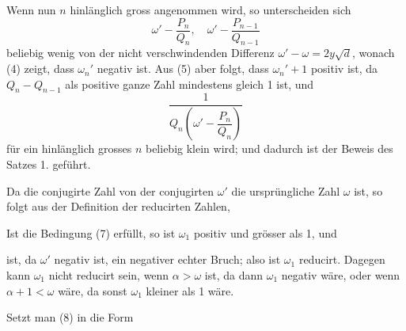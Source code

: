 

Wenn nun $n$ hinlänglich gross angenommen wird, so unterscheiden sich
\[
\omega' - \frac{P_n}{Q_n}, \quad \omega' - \frac{P_{n-1}}{Q_{n-1}}
\]
beliebig wenig von der nicht verschwindenden Differenz $\omega' - \omega = 2y\sqrt{d}$, wonach (4) zeigt, dass $\omega_n'$ negativ ist. Aus (5) aber folgt, dass $\omega_n' + 1$ positiv ist, da $Q_n - Q_{n-1}$ als positive ganze Zahl mindestens gleich 1 ist, und
\[
\frac{1}{Q_n\left(\omega' - \dfrac{P_n}{Q_n}\right)}
\]
für ein hinlänglich grosses $n$ beliebig klein wird; und dadurch ist der Beweis des Satzes 1. geführt.

Da die conjugirte Zahl von der conjugirten $\omega'$ die ursprüngliche Zahl $\omega$ ist, so folgt aus der Definition der reducirten Zahlen, 





Ist die Bedingung (7) erfüllt, so ist $\omega_1$ positiv und grösser als 1, und


ist, da $\omega'$ negativ ist, ein negativer echter Bruch; also ist $\omega_1$ reducirt. Dagegen kann $\omega_1$ nicht reducirt sein, wenn $\alpha > \omega$ ist, da dann $\omega_1$ negativ wäre, oder wenn $\alpha + 1 < \omega$ wäre, da sonst $\omega_1$ kleiner als 1 wäre.

Setzt man (8) in die Form

